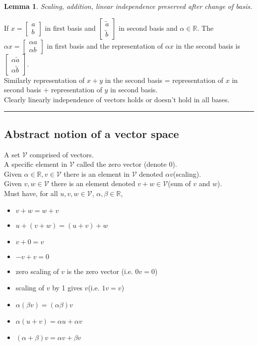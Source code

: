 \documentclass[twoside]{article}
\newtheorem{lemma}[theorem]{Lemma}
\newenvironment{proof}{{\bf Proof:}}{\hfill\rule{2mm}{2mm}}
\begin{document}
\begin{lemma}Scaling, addition, linear independence preserved after change of basis.\end{lemma}
\begin{proof}
If $x=
\begin{bmatrix}
a\\
b
\end{bmatrix}$
 in first basis and
$\begin{bmatrix}
           \widetilde{a}\\
           \widetilde{b}
\end{bmatrix}$ in second basis and $\alpha \in \mathbb{R}$.
The $\alpha x = \begin{bmatrix}
\alpha a\\
\alpha b
\end{bmatrix}$ in first basis and the representation of $\alpha x$ in the second basis is $\begin{bmatrix}
\alpha \widetilde{a}\\
\alpha \widetilde{b}
\end{bmatrix}$.\\
Similarly representation of $x +y$ in the second basis = representation of $x$ in second basis + representation of $y$ in second basis.\\
Clearly linearly independence of vectors holds or doesn't hold in all bases.
\end{proof}
\subsection{Abstract notion of a vector space}
A set $\mathcal{V}$ comprised of vectors.\\
A specific element in \(\mathcal{V}\) called the zero vector (denote 0).\\
Given $\alpha \in \mathbb{R}, v \in  \mathcal{V}$ there is an element in  $\mathcal{V}$ denoted $\alpha v$(scaling).\\
Given $v,w \in  \mathcal{V}$ there is an element denoted $v+w\in  \mathcal{V}$(sum of $v$ and $w$).\\
Must have, for all $u,v,w \in \mathcal{V}$, $\alpha,\beta \in \mathbb{R}$,
\begin{itemize}
\item $v+w=w+v$
\item $u+(v+w)=(u+v)+w$
\item $v+0=v$
\item $-v+v=0$
\item zero scaling of $v$ is the zero vector (i.e. $0v=0$)
\item scaling of $v$ by 1 gives $v$(i.e. $1v=v$)
\item $\alpha(\beta v)=(\alpha \beta)v$
\item $\alpha(u+v)=\alpha u+\alpha v$
\item $(\alpha+ \beta) v=\alpha v + \beta v$
\end{itemize}
\end{document}
